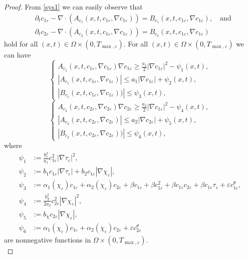 \documentclass[a4paper,10pt]{article}
\theoremstyle{definition}
\begin{document}
\begin{proof}
\noindent
From \eqref{sys1} we can easily observe that
\begin{align*}
  &\partial_t c_{1\varepsilon} - \nabla \cdot (A_{c_1}(x, t, c_{1\varepsilon}, \nabla c_{1\varepsilon})) = B_{c_1}(x, t, c_{1\varepsilon}, \nabla c_{1\varepsilon}),   \quad \text{and}\\[5pt]
  &\partial_t c_{2\varepsilon} - \nabla \cdot (A_{c_2}(x, t, c_{1\varepsilon}, \nabla c_{1\varepsilon})) = B_{c_2}(x, t, c_{1\varepsilon}, \nabla c_{1\varepsilon})
\end{align*}
hold for all $(x, t) \in \Omega \times (0, T_{\max, \varepsilon}) $. For all $(x, t) \in \Omega \times (0, T_{\max, \varepsilon})$ we can have
\begin{equation*}
  \begin{cases}
     A_{c_1}(x, t, c_{1\varepsilon}, \nabla c_{1\varepsilon})\nabla c_{1\varepsilon}  \geq \frac{a_1}{2} |\nabla c_{1\varepsilon}|^2 - \psi_1(x, t),  \\[5pt]
    |A_{c_1}(x, t, c_{1\varepsilon}, \nabla c_{1\varepsilon})| \leq a_1 |\nabla c_{1\varepsilon}| + \psi_2(x, t),   \\[5pt]
    |B_{c_1}(x, t, c_{1\varepsilon}, \nabla c_{1\varepsilon}))| \leq \psi_3(x, t),
  \end{cases}
\end{equation*}
\begin{equation*}
  \begin{cases}
     A_{c_2}(x, t, c_{2\varepsilon}, \nabla c_{2\varepsilon})\nabla c_{2\varepsilon}  \geq \frac{a_2}{2} |\nabla c_{1\varepsilon}|^2 - \psi_4(x, t),  \\[5pt]
    |A_{c_2}(x, t, c_{2\varepsilon}, \nabla c_{2\varepsilon})| \leq a_2 |\nabla c_{2\varepsilon}| + \psi_5(x, t),   \\[5pt]
    |B_{c_2}(x, t, c_{2\varepsilon}, \nabla c_{2\varepsilon}))| \leq \psi_6(x, t),
  \end{cases}
\end{equation*}
\noindent
where
\begin{align*}
 \psi_1 &:= \frac{b_\tau^2}{a_1} c_{1\varepsilon}^2 |\nabla \tau_\varepsilon|^2,\\ \psi_2 &:=  b_1 c_{1\varepsilon} |\nabla \tau_\varepsilon| + b_2 c_{1\varepsilon} |\nabla \chi_\varepsilon|,\\
  \psi_3 &:= \alpha_1(\chi_\varepsilon)  c_{1\varepsilon}  + \alpha_2(\chi_\varepsilon) c_{2\varepsilon} + \beta c_{1\varepsilon} + \beta c_{1\varepsilon}^2 + \beta c_{1\varepsilon} c_{2\varepsilon} + \beta c_{1\varepsilon} \tau_\varepsilon +\varepsilon c_{1\varepsilon}^\theta,\\
  \psi_4 &:=  \frac{b_\chi^2}{2a_2} c_{2\varepsilon}^2 |\nabla \chi_\varepsilon|^2,\\
 \psi_5 &:= b_\chi c_{2\varepsilon} |\nabla \chi_\varepsilon|,\\ 
 \psi_6 &:= \alpha_1(\chi_\varepsilon) c_{1\varepsilon}+\alpha_2(\chi_\varepsilon)  c_{2\varepsilon} + \varepsilon c_{2\varepsilon}^\theta
 \end{align*}
  are nonnegative functions in $\Omega \times (0, T_{\max, \varepsilon})$. \\[-1.5ex]
  

\end{proof}
\end{document}
